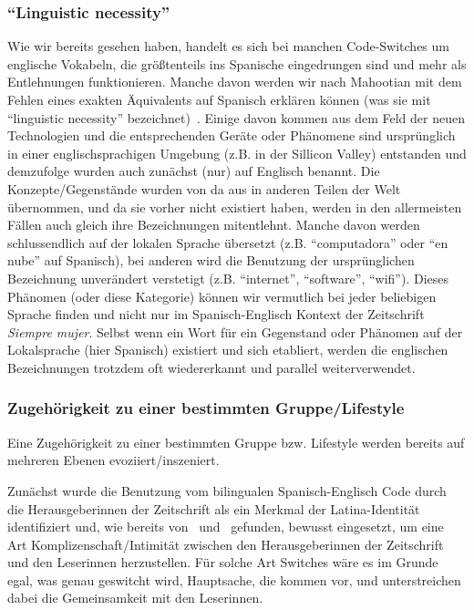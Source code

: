 \subsubsection{``Linguistic necessity''}
Wie wir bereits gesehen haben, handelt es sich bei manchen Code-Switches um englische Vokabeln, die größtenteils ins Spanische eingedrungen sind und mehr als Entlehnungen funktionieren.
Manche davon werden wir nach Mahootian mit dem Fehlen eines exakten Äquivalents auf Spanisch erklären können (was sie mit ``linguistic necessity'' bezeichnet)~\cite{Mahootian05}.
Einige davon kommen aus dem Feld der neuen Technologien und die entsprechenden Geräte oder Phänomene sind ursprünglich in einer englischsprachigen Umgebung (z.B. in der Sillicon Valley) entstanden und demzufolge wurden auch zunächst (nur) auf Englisch benannt.
Die Konzepte/Gegenstände wurden von da aus in anderen Teilen der Welt übernommen, und da sie vorher nicht existiert haben, werden in den allermeisten Fällen auch gleich ihre Bezeichnungen mitentlehnt.
Manche davon werden schlussendlich auf der lokalen Sprache übersetzt (z.B. ``computadora'' oder ``en nube'' auf Spanisch), bei anderen wird die Benutzung der ursprünglichen Bezeichnung unverändert verstetigt (z.B. ``internet'', ``software'', ``wifi'').
Dieses Phänomen (oder diese Kategorie) können wir vermutlich bei jeder beliebigen Sprache finden und nicht nur im Spanisch-Englisch Kontext der Zeitschrift \textit{Siempre mujer}.
Selbst wenn ein Wort für ein Gegenstand oder Phänomen auf der Lokalsprache (hier Spanisch) existiert und sich etabliert, werden die englischen Bezeichnungen trotzdem oft wiedererkannt und parallel weiterverwendet.

\subsubsection{Zugehörigkeit zu einer bestimmten Gruppe/Lifestyle}
Eine Zugehörigkeit zu einer bestimmten Gruppe bzw. Lifestyle werden bereits auf mehreren Ebenen evoziiert/inszeniert.

Zunächst wurde die Benutzung vom bilingualen Spanisch-Englisch Code durch die Herausgeberinnen der Zeitschrift als ein Merkmal der Latina-Identität identifiziert und, wie bereits von~\cite{Ticknor12} und~\cite{Mahootian05} gefunden, bewusst eingesetzt, um eine Art Komplizenschaft/Intimität zwischen den Herausgeberinnen der Zeitschrift und den Leserinnen herzustellen.
Für solche Art Switches wäre es im Grunde egal, was genau geswitcht wird, Hauptsache, die kommen vor, und unterstreichen dabei die Gemeinsamkeit mit den Leserinnen.

